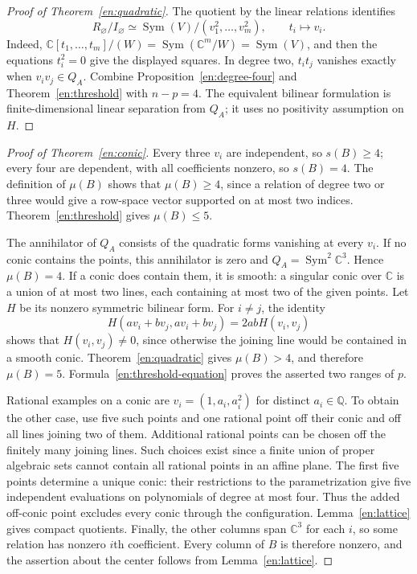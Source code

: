 \documentclass[12pt]{amsart}
\theoremstyle{definition}
\theoremstyle{remark}
\numberwithin{equation}{section}
\DeclareMathOperator{\Sym}{Sym}
\newcommand{\C}{\mathbb{C}}
\newcommand{\Q}{\mathbb{Q}}
\begin{document}
\begin{proof}[Proof of Theorem~\ref{en:quadratic}]
The quotient by the linear relations identifies
\begin{equation}\label{en:quotient}
 R_{\varnothing}/I_{\varnothing}
 \simeq \Sym(V)/(v_1^2,\ldots,v_m^2),\qquad t_i\longmapsto v_i.
\end{equation}
Indeed, $\C[t_1,\ldots,t_m]/(W)=\Sym(\C^m/W)=\Sym(V)$, and then
the equations $t_i^2=0$ give the displayed squares.
In degree two, $t_i t_j$ vanishes exactly when $v_i v_j\in Q_A$.
Combine Proposition~\ref{en:degree-four} and Theorem~\ref{en:threshold} with
$n-p=4$. The equivalent bilinear formulation is finite-dimensional linear
separation from $Q_A$; it uses no positivity assumption on $H$.
\end{proof}

\begin{proof}[Proof of Theorem~\ref{en:conic}]
Every three $v_i$ are independent, so $s(B)\geq4$; every four are
dependent, with all coefficients nonzero, so $s(B)=4$.
The definition of $\mu(B)$ shows that $\mu(B)\geq4$, since a relation of
degree two or three would give a row-space vector supported on at most two
indices. Theorem~\ref{en:threshold} gives $\mu(B)\leq5$.

The annihilator of $Q_A$ consists of the quadratic forms vanishing at every
$v_i$. If no conic contains the points, this annihilator is zero and
$Q_A=\Sym^2\C^3$. Hence $\mu(B)=4$.
If a conic does contain them, it is smooth: a singular conic over $\C$ is
a union of at most two lines, each containing at most two of the given
points. Let $H$ be its nonzero symmetric bilinear form.
For $i\ne j$, the identity
\[
 H(av_i+bv_j,av_i+bv_j)=2abH(v_i,v_j)
\]
shows that $H(v_i,v_j)\ne0$, since otherwise the joining line would be
contained in a smooth conic. Theorem~\ref{en:quadratic} gives $\mu(B)>4$,
and therefore $\mu(B)=5$. Formula~\eqref{en:threshold-equation} proves
the asserted two ranges of $p$.

Rational examples on a conic are $v_i=(1,a_i,a_i^2)$ for distinct
$a_i\in\Q$. To obtain the other case, use five such points and one rational
point off their conic and off all lines joining two of them. Additional
rational points can be chosen off the finitely many joining lines.
Such choices exist since a finite union of proper algebraic sets cannot
contain all rational points in an affine plane. The first five points
determine a unique conic: their restrictions to the parametrization give
five independent evaluations on polynomials of degree at most four.
Thus the added off-conic point excludes every conic through the configuration.
Lemma~\ref{en:lattice} gives compact quotients. Finally, the other columns span
$\C^3$ for each $i$, so some relation has nonzero $i$th coefficient.
Every column of $B$ is therefore nonzero, and the assertion about the center
follows from Lemma~\ref{en:lattice}.
\end{proof}
\end{document}
